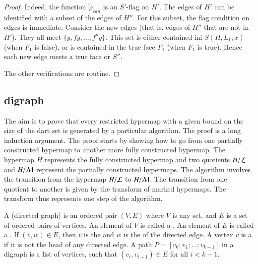 \begin{proof}
 
Indeed, the function $\check\varphi_{can}$ is an $S'$-flag on $H'$.  The edges of
$H'$ can be identified with a subset of the edges of $H''$.  For this
subset, the flag condition on edges is immediate.  Consider the
new  edges  (that is, edges of $H''$ that are not in $H'$).
They all meet $\{y,f y,\ldots,f^p y\}$.  This set is either contained
ini $S(H,L_1,x)$ (when $F_1$ is false), or is contained in the true face
$F_1$ (when $F_1$ is true).  Hence each new  edge meets
a true face or $S''$.


The other verifications are routine.
\end{proof}


\subsection{digraph}

The aim is to prove that every restricted hypermap with a given bound
on the size of the dart set is generated by a particular algorithm.
The proof is a long induction argument.  The proof starts by showing
how to go from one partially constructed hypermap to another more
fully constructed hypermap.  The hypermap $H$ represents the fully
constructed hypermap and two quotients $H/{\cal L}$ and $H/{\cal M}$
represent the partially constructed hypermaps.  The algorithm involves
the transition from the hypermap $H/{\cal L}$ to $H/{\cal M}$.  The
transition from one quotient to another is given by the transform of
marked hypermaps.  The transform thus represents one step of the
algorithm.  %


\begin{definition}
  A  (directed graph) is an ordered pair $(V,E)$
  where $V$ is any set, and $E$ is a set of ordered pairs of vertices.
  An element of $V$ is called a .  An element of $E$
  is called a .  If $(v,w)\in E$, then $v$ is
  the  and $w$ is the  of the directed
  edge.  A vertex $v$ is a  if it is not the head of any
  directed edge.  A path $P=[v_0;v_1;\ldots;v_{k-1}]$ in a digraph is
  a list of vertices, such that $(v_i,v_{i+1})\in E$ for all $i<k-1$.
\end{definition}

